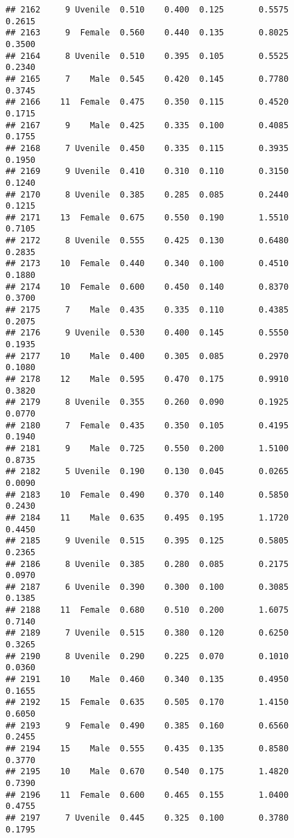 \documentclass[
]{article}
\begin{document}
\begin{verbatim}
## 2162     9 Uvenile  0.510    0.400  0.125       0.5575         0.2615
## 2163     9  Female  0.560    0.440  0.135       0.8025         0.3500
## 2164     8 Uvenile  0.510    0.395  0.105       0.5525         0.2340
## 2165     7    Male  0.545    0.420  0.145       0.7780         0.3745
## 2166    11  Female  0.475    0.350  0.115       0.4520         0.1715
## 2167     9    Male  0.425    0.335  0.100       0.4085         0.1755
## 2168     7 Uvenile  0.450    0.335  0.115       0.3935         0.1950
## 2169     9 Uvenile  0.410    0.310  0.110       0.3150         0.1240
## 2170     8 Uvenile  0.385    0.285  0.085       0.2440         0.1215
## 2171    13  Female  0.675    0.550  0.190       1.5510         0.7105
## 2172     8 Uvenile  0.555    0.425  0.130       0.6480         0.2835
## 2173    10  Female  0.440    0.340  0.100       0.4510         0.1880
## 2174    10  Female  0.600    0.450  0.140       0.8370         0.3700
## 2175     7    Male  0.435    0.335  0.110       0.4385         0.2075
## 2176     9 Uvenile  0.530    0.400  0.145       0.5550         0.1935
## 2177    10    Male  0.400    0.305  0.085       0.2970         0.1080
## 2178    12    Male  0.595    0.470  0.175       0.9910         0.3820
## 2179     8 Uvenile  0.355    0.260  0.090       0.1925         0.0770
## 2180     7  Female  0.435    0.350  0.105       0.4195         0.1940
## 2181     9    Male  0.725    0.550  0.200       1.5100         0.8735
## 2182     5 Uvenile  0.190    0.130  0.045       0.0265         0.0090
## 2183    10  Female  0.490    0.370  0.140       0.5850         0.2430
## 2184    11    Male  0.635    0.495  0.195       1.1720         0.4450
## 2185     9 Uvenile  0.515    0.395  0.125       0.5805         0.2365
## 2186     8 Uvenile  0.385    0.280  0.085       0.2175         0.0970
## 2187     6 Uvenile  0.390    0.300  0.100       0.3085         0.1385
## 2188    11  Female  0.680    0.510  0.200       1.6075         0.7140
## 2189     7 Uvenile  0.515    0.380  0.120       0.6250         0.3265
## 2190     8 Uvenile  0.290    0.225  0.070       0.1010         0.0360
## 2191    10    Male  0.460    0.340  0.135       0.4950         0.1655
## 2192    15  Female  0.635    0.505  0.170       1.4150         0.6050
## 2193     9  Female  0.490    0.385  0.160       0.6560         0.2455
## 2194    15    Male  0.555    0.435  0.135       0.8580         0.3770
## 2195    10    Male  0.670    0.540  0.175       1.4820         0.7390
## 2196    11  Female  0.600    0.465  0.155       1.0400         0.4755
## 2197     7 Uvenile  0.445    0.325  0.100       0.3780         0.1795

\end{verbatim}
\end{document}
